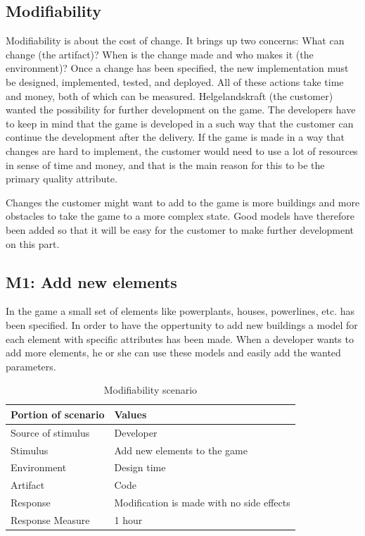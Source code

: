 \subsection{Modifiability}

Modifiability is about the cost of change. It brings up two concerns: What can change (the artifact)? 
When is the change made and who makes it (the environment)? 
Once a change has been specified, the new implementation must be designed, 
implemented, tested, and deployed. All of these actions take time and money, both of which can be measured.
Helgelandskraft (the customer) wanted the possibility for further development on the game. The developers
have to keep in mind that the game is developed in a such way that the customer can continue
the development after the delivery. If the game is made in a way that changes are hard to implement, 
the customer would need to use a lot of resources in sense of time and money, and that is the main 
reason for this to be the primary quality attribute.

Changes the customer might want to add to the game is more buildings and more obstacles to take
the game to a more complex state. Good models have therefore been added so that it will be easy for 
the customer to make further development on this part.

\subsection*{M1: Add new elements}
In the game a small set of elements like powerplants, houses, powerlines, etc. has been specified.
In order to have the oppertunity to add new buildings a model for each element with specific attributes has been made. When a developer wants to add more elements, he or she can use these models and easily add the wanted parameters. 

\begin{table}[H]
\begin{tabular}{| l | l |}
	\hline
	\rowcolor{gray}
	{\bf Portion of scenario} & {\bf Values} \\ \hline
	Source of stimulus & Developer\\ \hline
	Stimulus & Add new elements to the game\\ \hline
	Environment & Design time \\ \hline
	Artifact & Code \\ \hline
	Response & Modification is made with no side effects\\ \hline
	Response Measure & 1 hour\\ \hline
\end{tabular}
\caption{Modifiability scenario}
\end{table}

